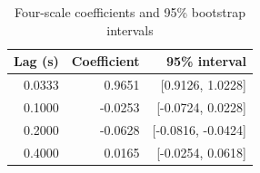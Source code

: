 \begin{table}[htbp]
\centering
\small
\caption{Four-scale coefficients and 95\% bootstrap intervals}
\label{tab:coef}
\setlength{\tabcolsep}{4pt}
\begin{tabular}{rrr}
\toprule
Lag (s) & Coefficient & 95\% interval\\
\midrule
0.0333 & 0.9651 & [0.9126, 1.0228]\\
0.1000 & -0.0253 & [-0.0724, 0.0228]\\
0.2000 & -0.0628 & [-0.0816, -0.0424]\\
0.4000 & 0.0165 & [-0.0254, 0.0618]\\
\bottomrule
\end{tabular}
\end{table}
